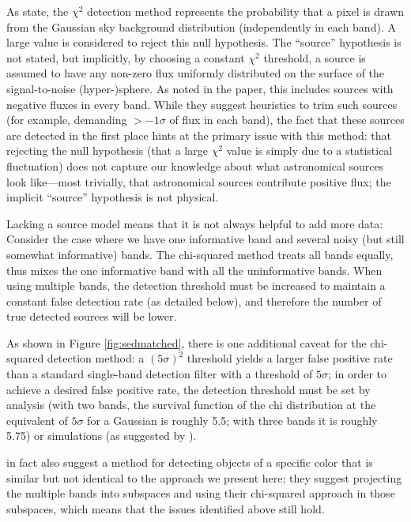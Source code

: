 \documentclass[11pt,letterpaper,linenumbers]{aastex63}
\begin{document}
As \cite{szalay1999} state, the $\chi^2$ detection method represents
the probability that a pixel is drawn from the Gaussian sky background
distribution (independently in each band).  A large value is
considered to reject this null hypothesis.  The ``source'' hypothesis
is not stated, but implicitly, by choosing a constant $\chi^2$
threshold, a source is assumed to have any non-zero flux uniformly
distributed on the surface of the signal-to-noise (hyper-)sphere.  As
noted in the paper, this includes sources with negative fluxes in
every band.  While they suggest heuristics to trim such sources (for
example, demanding $> -1 \sigma$ of flux in each band), the fact that
these sources are detected in the first place hints at the primary
issue with this method: that rejecting the null hypothesis (that a
large $\chi^2$ value is simply due to a statistical fluctuation) does
not capture our knowledge about what astronomical sources look
like---most trivially, that astronomical sources contribute positive
flux; the implicit ``source'' hypothesis is not physical.

Lacking a source model means that it is not always helpful to add more
data: Consider the case where we have one informative band and several
noisy (but still somewhat informative) bands.  The chi-squared method
treats all bands equally, thus mixes the one informative band with all
the uninformative bands.  When using multiple bands, the detection
threshold must be increased to maintain a constant false detection
rate (as detailed below), and therefore the number of true detected
sources will be lower.

As shown in Figure \ref{fig:sedmatched}, there is one additional
caveat for the chi-squared detection method: a $(5\sigma)^2$ threshold
yields a larger false positive rate than a standard single-band
detection filter with a threshold of $5\sigma$; in order to achieve a
desired false positive rate, the detection threshold must be set by
analysis (with two bands, the survival function of the chi
distribution at the equivalent of $5 \sigma$ for a Gaussian is roughly
5.5; with three bands it is roughly 5.75) or simulations (as suggested
by \cite{szalay1999}).

\cite{szalay1999} in fact also suggest a method for detecting objects
of a specific color that is similar but not identical to the approach
we present here; they suggest projecting the multiple bands into
subspaces and using their chi-squared approach in those subspaces,
which means that the issues identified above still hold.
\end{document}
